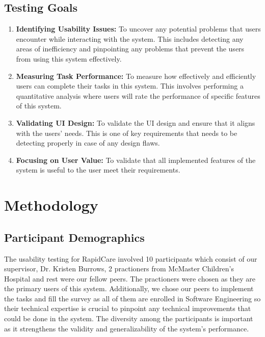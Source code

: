 \documentclass{article}
\begin{document}
\subsection{Testing Goals}

\begin{enumerate}
    \item \textbf{Identifying Usability Issues:} To uncover any potential problems that users encounter while interacting with the system. This includes detecting any areas of inefficiency and pinpointing any problems that prevent the users from using this system effectively.
    \item \textbf{Measuring Task Performance:} To measure how effectively and efficiently users can complete their tasks in this system. This involves performing a quantitative analysis where users will rate the performance of specific features of this system.
    \item \textbf{Validating UI Design:} To validate the UI design and ensure that it aligns with the users' needs. This is one of key requirements that needs to be detecting properly in case of any design flaws.
    \item \textbf{Focusing on User Value:} To validate that all implemented features of the system is useful to the user meet their requirements.
\end{enumerate}

\newpage

\section{Methodology}

\subsection{Participant Demographics}

The usability testing for RapidCare involved 10 participants which consist of our supervisor, Dr. Kristen Burrows, 2 practioners from McMaster Children's Hospital and rest were our fellow peers. The practioners were chosen as they are the primary users of this system. Additionally, we chose our peers to implement the tasks and fill the survey as all of them are enrolled in Software Engineering so their technical expertise is crucial to pinpoint any technical improvements that could be done in the system. The diversity among the participants is important as it strengthens the validity and generalizability of the system's performance.      
\end{document}
